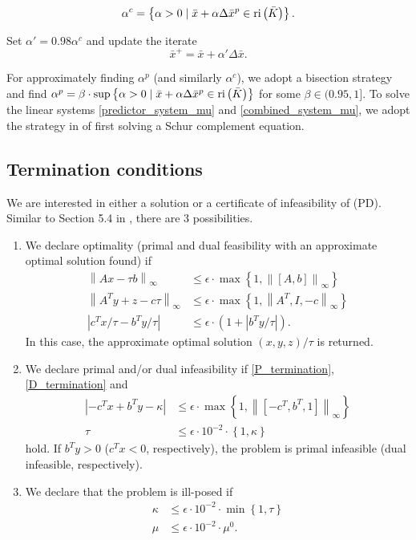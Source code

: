 \documentclass[10pt]{article}
\theoremstyle{definition}
\theoremstyle{plain}
\def\relint{\protect{\textnormal{ri}}}
\begin{document}
\[\alpha^c = \left\{ \alpha > 0 \mid \bar x + \alpha \Delta \bar x^p \in \relint \left(\bar K\right)
\right\}. \]

Set $\alpha' = 0.98 \alpha^c$ and update the iterate
\[\bar x^+ = \bar x + \alpha' \Delta\bar x.\]

For approximately finding $\alpha^p$ (and similarly $\alpha^c$), we adopt a bisection strategy and find $\alpha^p = \beta \cdot \sup \left\{ \alpha > 0 \mid \bar x + \alpha \Delta \bar x^p \in \relint \left(\bar K\right)
\right\}$ for some $\beta \in (0.95,1]$. To solve the linear systems \eqref{predictor_system_mu} and \eqref{combined_system_mu}, we adopt the strategy in \cite{SDPT3_2010} of first solving a Schur complement equation.
\subsection{Termination conditions}
We are interested in either a solution or a certificate of infeasibility of (PD). Similar to Section 5.4 in \cite{Skarjaa_and_Ye}, there are 3 possibilities. 
\begin{enumerate}
	\item We declare optimality (primal and dual feasibility with an approximate optimal solution found) if
	\begin{align}
		\left\| Ax-\tau b \right\|_{\infty} &\leq \epsilon \cdot \max \left\{1, \left\|[A,b]\right\|_{\infty}\right\} \label{P_termination}\\
		\left\|A^T y + z-c\tau\right\|_{\infty} &\leq \epsilon \cdot \max \left\{1, \left\|A^T, I , -c\right\|_{\infty}\right\}\label{D_termination}\\
		\left|c^T x/\tau - b^T y/\tau\right|  &\leq \epsilon\cdot\left(1+\left|b^T y/\tau\right|\right).\label{A_termination}
	\end{align}
	In this case, the approximate optimal solution $(x,y,z)/\tau$ is returned.
	\item We declare primal and/or dual infeasibility if \eqref{P_termination}, \eqref{D_termination} and 
	\begin{align}
		\left|-c^T x+b^T y - \kappa \right| &\leq \epsilon\cdot \max \left\{1, \left\|\left[-c^T, b^T, 1\right]\right\|_{\infty}\right\} \label{G_termination}\\
		\tau &\leq \epsilon \cdot 10^{-2} \cdot \left\{1,\kappa\right\}\label{T_terminal}
	\end{align}
	hold. If $b^T y>0$ ($c^T x<0$, respectively), the problem is primal infeasible (dual infeasible, respectively).
	\item We declare that the problem is ill-posed if 
	\begin{align*}
		\kappa &\leq \epsilon \cdot 10^{-2}\cdot \min \left\{1,\tau\right\}\\
		\mu &\leq \epsilon \cdot 10^{-2}\cdot \mu^0.
	\end{align*}
\end{enumerate}

\newpage
\newpage
{}

\end{document}
